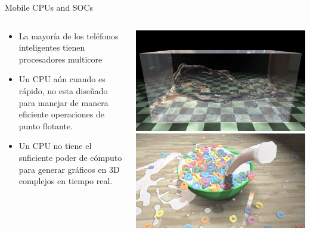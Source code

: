 



\begin{frame}{Mobile CPUs and SOCs}
\begin{columns}
\begin{column}{0.60\textwidth}  
\begin{itemize}
\item La mayoría de los teléfonos inteligentes tienen procesadores multicore
\item Un CPU aún cuando es rápido, no esta diseñado para manejar de manera eficiente operaciones de punto flotante. 
\item Un CPU no tiene el suficiente poder de cómputo para generar gráficos en 3D complejos en tiempo real. 
\end{itemize}
\end{column}
\begin{column}{0.40\textwidth}  
    \begin{center}
     \includegraphics[width=\textwidth]{Figs/Nvidia_Fluido.jpg}\\
          \includegraphics[width=\textwidth]{Figs/Nvidia_FleX_cereal.jpg}\\
     \end{center}
\end{column}
\end{columns}
\end{frame}


